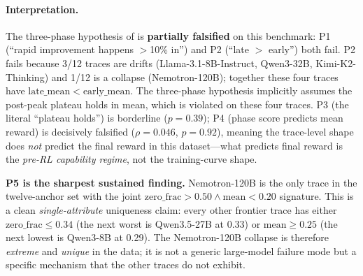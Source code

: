 \paragraph{Interpretation.}
The three-phase hypothesis of \citet{nimmaturi2025predictive} is \textbf{partially
falsified} on this benchmark: P1 (``rapid improvement happens
$>$10\% in'') and P2 (``late $>$ early'') both fail. P2 fails because
3/12 traces are drifts (Llama-3.1-8B-Instruct, Qwen3-32B,
Kimi-K2-Thinking) and 1/12 is a collapse (Nemotron-120B); together
these four traces have $\mathrm{late\_mean} < \mathrm{early\_mean}$.
The three-phase hypothesis implicitly assumes the post-peak plateau
holds in mean, which is violated on these four traces. P3 (the literal
``plateau holds'') is borderline ($p=0.39$); P4 (phase score predicts
mean reward) is decisively falsified ($\rho = 0.046$, $p = 0.92$),
meaning the trace-level shape does \emph{not} predict the final reward
in this dataset---what predicts final reward is the
\emph{pre-RL capability regime}, not the training-curve shape.

\textbf{P5 is the sharpest sustained finding.} Nemotron-120B is the
only trace in the twelve-anchor set with the joint
$\mathrm{zero\_frac} > 0.50 \wedge \mathrm{mean} < 0.20$ signature.
This is a clean \emph{single-attribute} uniqueness claim: every other
frontier trace has either $\mathrm{zero\_frac} \le 0.34$ (the next
worst is Qwen3.5-27B at 0.33) or $\mathrm{mean} \ge 0.25$ (the next
lowest is Qwen3-8B at 0.29). The Nemotron-120B collapse is therefore
\emph{extreme} and \emph{unique} in the data; it is not a generic
large-model failure mode but a specific mechanism that the other
traces do not exhibit.

